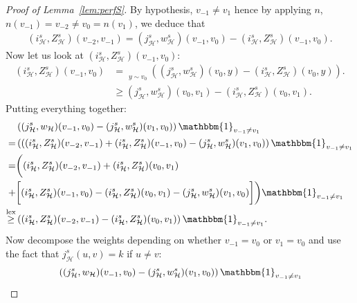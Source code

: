 \documentclass[11pt]{article}
\DeclareMathOperator{\lex}{lex}
\DeclareMathOperator*{\maxlex}{\overset{\lex}{\max}}
\begin{document}
\begin{proof}[Proof of Lemma~\ref{lem:perfS}]
By hypothesis, $v_{-1} \neq v_{1}$ hence by applying $n$, $n(v_{-1})=v_{-2} \neq v_0=n(v_1)$, we deduce that 
\begin{align*}
    (i^s_{\mathcal{H}},Z^s_{\mathcal{H}})(v_{-2},v_{-1})=(j_{\mathcal{H}}^s,w_{\mathcal{H}}^s)(v_{-1},v_{0})-(i^s_{\mathcal{H}},Z^s_{\mathcal{H}})(v_{-1},v_0).
\end{align*}
Now let us look at $(i^s_{\mathcal{H}},Z^s_{\mathcal{H}})(v_{-1},v_0)$:
\begin{equation}
\begin{aligned}\label{eq:aldous2}
    (i^s_{\mathcal{H}},Z^s_{\mathcal{H}})(v_{-1},v_0) &= \underset{{ y \sim v_0}}{\maxlex}\left( (j_{\mathcal{H}}^s,w_{\mathcal{H}}^s)(v_0,y)-(i^s_{\mathcal{H}},Z^s_{\mathcal{H}})(v_0,y) \right). \\
    &\geq (j_{\mathcal{H}}^s,w_{\mathcal{H}}^s)(v_0,v_1)-(i^s_{\mathcal{H}},Z^s_{\mathcal{H}})(v_0,v_1).
\end{aligned}
\end{equation}
Putting everything together:
\begin{equation}\label{eq:aldous4}
\begin{aligned}
    &\left((j_{\mathcal{H}}^s,w_{\mathcal{H}})(v_{-1},v_0)-(j_{\mathcal{H}}^s,w_{\mathcal{H}}^s)(v_{1},v_0) \right)\mathbbm{1}_{v_{-1} \neq v_1} \\
    =&\left(((i^s_{\mathcal{H}},Z^s_{\mathcal{H}})(v_{-2},v_{-1})+(i^s_{\mathcal{H}},Z^s_{\mathcal{H}})(v_{-1},v_0)-(j_{\mathcal{H}}^s,w_{\mathcal{H}}^s)(v_{1},v_0)\right)\mathbbm{1}_{v_{-1} \neq v_1} \\
    =&\bigg((i^s_{\mathcal{H}},Z^s_{\mathcal{H}})(v_{-2},v_{-1})+(i^s_{\mathcal{H}},Z^s_{\mathcal{H}})(v_0,v_1) \\
    +&\bigg[(i^s_{\mathcal{H}},Z^s_{\mathcal{H}})(v_{-1},v_0)-(i^s_{\mathcal{H}},Z^s_{\mathcal{H}})(v_0,v_1)-(j_{\mathcal{H}}^s,w_{\mathcal{H}}^s)(v_{1},v_0)\bigg]\bigg)\mathbbm{1}_{v_{-1} \neq v_1} \\
    \overset{\lex}{\geq}&\left((i^s_{\mathcal{H}},Z^s_{\mathcal{H}})(v_{-2},v_{-1}) -(i^s_{\mathcal{H}},Z^s_{\mathcal{H}})(v_{0},v_{1})\right)\mathbbm{1}_{v_{-1} \neq v_1} .
\end{aligned}
\end{equation}
Now decompose the weights depending on whether $v_{-1}=v_0$ or $v_{1}=v_0$ and use the fact that $j_{\mathcal{H}}^s(u,v)=k$  if $u \neq v$:
\begin{align*}
    &\left((j_{\mathcal{H}}^s,w_{\mathcal{H}})(v_{-1},v_0)-(j_{\mathcal{H}}^s,w_{\mathcal{H}}^s)(v_{1},v_0) \right)\mathbbm{1}_{v_{-1} \neq v_1} \\

\end{align*}
\end{proof}
\end{document}
